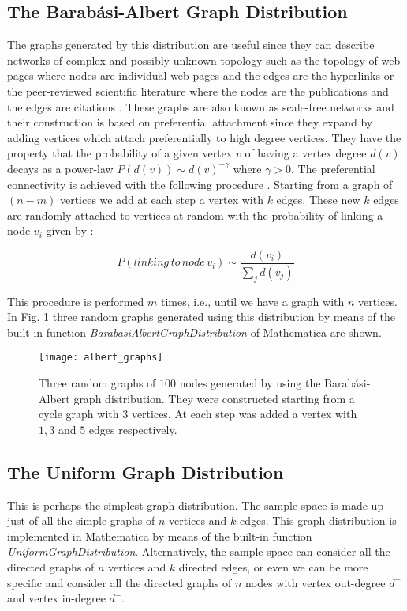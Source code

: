 \subsection{The Barabási-Albert Graph Distribution}
\label{Barabasi-Albert}
The graphs generated by this distribution are useful since they can describe networks of complex and possibly unknown topology such as the topology of web pages where nodes are individual web pages and the edges are the hyperlinks or the peer-reviewed scientific literature where the nodes are the publications and the edges are citations \cite{scale_free}. These graphs are also known as scale-free networks and their construction is based on preferential attachment since they expand by adding vertices which attach preferentially to high degree vertices. They have the property that the probability of a given vertex $v$ of having a vertex degree $d(v)$ decays as a power-law $P(d(v)) \sim d(v)^{-\gamma}$ where $\gamma>0$. The preferential connectivity is achieved with the following procedure \cite{albert}. Starting from a graph of $(n-m)$ vertices we add at each step a vertex with $k$ edges. These new $k$ edges are randomly attached to vertices at random with the probability of linking a node $v_{i}$ given by \cite{scale_free}:

\begin{equation}
\label{scale_free}
P(linking \, to \, node \, v_{i}) \sim \frac{d(v_{i})}{\sum_{j} d(v_{j})}
\end{equation}

This procedure is performed $m$ times, i.e., until we have a graph with $n$ vertices. In Fig. \ref{fig:albert_graphs} three random graphs generated using this distribution by means of the built-in function \textit{BarabasiAlbertGraphDistribution} of Mathematica are shown.

\begin{figure}[h]
\centering
\texttt{[image: albert\_graphs]}
\caption[Three random graphs generated by using the Barabási-Albert graph distribution.]{Three random graphs of $100$ nodes generated by using the Barabási-Albert graph distribution. They were constructed starting from a cycle graph with $3$ vertices. At each step was added a vertex with $1,3$ and $5$ edges respectively.}
\label{fig:albert_graphs}
\end{figure}

\subsection{The Uniform Graph Distribution}
This is perhaps the simplest graph distribution. The sample space is made up just of all the simple graphs of $n$ vertices and $k$ edges. This graph distribution is implemented in Mathematica by means of the built-in function \textit{UniformGraphDistribution}. Alternatively, the sample space can consider all the directed graphs of $n$ vertices and $k$ directed edges, or even we can be more specific and consider all the directed graphs of $n$ nodes with vertex out-degree $ d^{+}$ and vertex in-degree $ d^{-}$.


